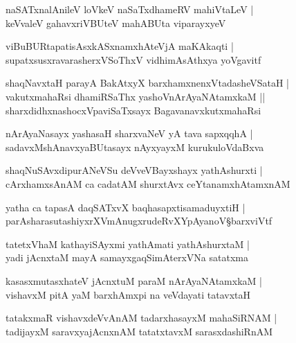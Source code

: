 \begin{shloka}
naSATxnalAnileV loVkeV naSaTxdhameRV mahiVtaLeV |\\
keVvaleV gahavxriVBUteV mahABUta viparayxyeV 
\end{shloka}

\begin{shloka}
viBuBURtapatisAsxkASxnamxhAteVjA maKAkaqti |\\
supatxsusxravarasherxVSoThxV vidhimAsAthxya yoVgavitf 
\end{shloka}

\begin{shloka}
shaqNavxtaH parayA BakAtxyX barxhamxnenxVtadasheVSataH |\\
vakutxmahaRsi dhamiRSaThx yashoVnArAyaNAtamxkaM ||\\
sharxdidhxnashocxVpaviSaTxsayx BagavanavxkutxmahaRsi 
\end{shloka}

\begin{shloka}
nArAyaNasayx yashasaH sharxvaNeV yA tava sapxqqhA |\\
sadavxMshAnavxyaBUtasayx nAyxyayxM kurukuloVdaBxva 
\end{shloka}

\begin{shloka}
shaqNuSAvxdipurANeVSu deVveVBayxshayx yathAshurxti |\\
cArxhamxsAnAM ca cadatAM shurxtAvx ceYtanamxhAtamxnAM 
\end{shloka}

\begin{shloka}
yatha ca tapasA daqSATxvX baqhasapxtisamaduyxtiH |\\
parAsharasutashiyxrXVmAnugxrudeRvXYpAyanoV\S barxviVtf 
\end{shloka}

\begin{shloka}
tatetxVhaM kathayiSAyxmi yathAmati yathAshurxtaM |\\
yadi jAcnxtaM mayA samayxgaqSimAterxVNa satatxma
\end{shloka}

\begin{shloka}
kasasxmutasxhateV jAcnxtuM paraM nArAyaNAtamxkaM |\\
vishavxM pitA yaM barxhAmxpi na veVdayati tatavxtaH
\end{shloka}

\begin{shloka}
tatakxmaR vishavxdeVvAnAM tadarxhasayxM mahaSiRNAM |\\
tadijayxM saravxyajAcnxnAM tatatxtavxM sarasxdashiRnAM 
\end{shloka}

